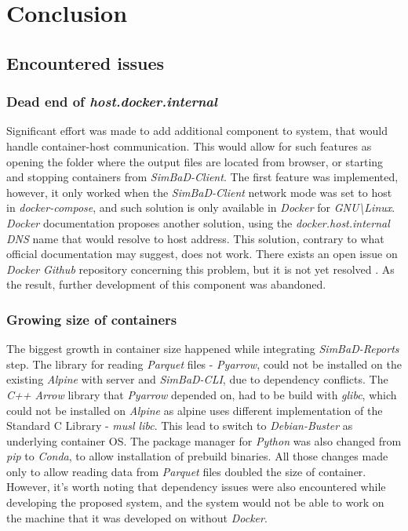 \chapter{Conclusion}
\label{chapter:6}
\section{Encountered issues}
\subsection{Dead end of \textit{host.docker.internal}}
Significant effort was made to add additional component to system, that would handle container-host communication. This would allow for such features as opening the folder where the output files are located from browser, or starting and stopping containers from \textit{SimBaD-Client}. The first feature was implemented, however, it only worked when the \textit{SimBaD-Client} network mode was set to host in \textit{docker-compose}, and such solution is only available in \textit{Docker} for \textit{GNU\textbackslash Linux}. \textit{Docker} documentation proposes another solution, using the \textit{docker.host.internal} \textit{DNS} name that would resolve to host address. This solution, contrary to what official documentation may suggest, does not work. There exists an open issue on \textit{Docker} \textit{Github} repository concerning this problem, but it is not yet resolved \cite{DockfileIssue}. As the result, further development of this component was abandoned.
\subsection{Growing size of containers}
The biggest growth in container size happened while integrating \textit{SimBaD-Reports} step. The library for reading \textit{Parquet} files - \textit{Pyarrow}, could not be installed on the existing \textit{Alpine} with server and \textit{SimBaD-CLI}, due to dependency conflicts. The \textit{C++ Arrow} library that \textit{Pyarrow} depended on, had to be build with \textit{glibc}, which could not be installed on \textit{Alpine} as alpine uses different implementation of the Standard C Library - \textit{musl libc}. This lead to switch to \textit{Debian-Buster} as underlying container OS. The package manager for \textit{Python} was also changed from \textit{pip} to \textit{Conda}, to allow installation of prebuild binaries.
All those changes made only to allow reading data from \textit{Parquet} files doubled the size of container. However, it's worth noting that dependency issues were also encountered while developing the proposed system, and the system would not be able to work on the machine that it was developed on without \textit{Docker}.
